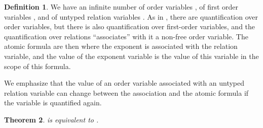 \documentclass[a4paper,12pt]{article}
\newtheorem{theorem}{Theorem}[section]
\theoremstyle{definition}
\newtheorem{definition}[theorem]{Definition}
\begin{document}
\begin{definition}
  We have an infinite number of order variables
  , of first order variables
  , and of untyped relation variables . As in , there are quantification
  over order variables, but there is also quantification over
  first-order variables, and the quantification over relations
  ``associates'' with it a non-free order variable. The atomic formula
  are then 
  where the exponent is associated with the relation variable, and the
  value of the exponent variable is the value of this variable in the
  scope of this formula.

  We emphasize that the value of an order variable associated
  with an untyped relation variable can change between the association
  and the atomic formula if the variable is quantified again.
\end{definition}
\begin{theorem}\label{vovo}
  \VO{} is equivalent to .
\end{theorem}
\end{document}
